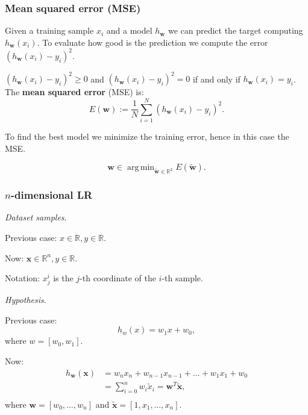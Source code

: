 \documentclass{beamer}
\DeclareMathOperator*{\argmin}{arg\,min}
\begin{document}
	\begin{frame}
		\frametitle{Mean squared error (MSE)}
		
		
		Given a training sample $x_i$ and a model $h_{\bm{w}}$ we can predict the target computing $h_{\bm{w}}(x_i)$. To evaluate how good is the prediction we compute the error $(h_{\bm{w}}(x_i) - y_i)^2$.
		
		\vspace{5 mm}
		
		$(h_{\bm{w}}(x_i) - y_i)^2 \geq 0$ and $(h_{\bm{w}}(x_i) - y_i)^2 = 0$ if and only if $h_{\bm{w}}(x_i) = y_i$. The \textbf{mean squared error} (MSE) is:
		$$E({\bm{w}}) := \frac{1}{N} \sum_{i=1}^{N} (h_{\bm{w}}(x_i) - y_i)^2.$$
		
		To find the best model we minimize the training error, hence in this case the MSE.
		
		$$\bm{w} \in \argmin_{\tilde{\bm{w}} \in \mathbb{R}^2} E(\tilde{\bm{w}}).$$
		
	\end{frame}

	\begin{frame}
		\frametitle{$n$-dimensional LR}
		\textsl{Dataset samples}.
		
		Previous case: $x \in \mathbb{R}, y \in \mathbb{R}$.
		
		\vspace{1 mm}
		
		Now:  $\bm{x} \in \mathbb{R}^n, y \in \mathbb{R}$.
		
		Notation: $x^i_j$ is the $j$-th coordinate of the $i$-th sample.
		
		\vspace{5 mm}
		
		\textsl{Hypothesis}.
		
		Previous case: 
		\begin{equation*}
			h_{w}(x) = w_1x + w_0,
		\end{equation*}
		where $w = [w_0, w_1]$.
		
		\vspace{1 mm}
		
		Now: 
		\begin{align*}
			h_{\bm{w}}(\bm{x}) &= w_{n}x_n + w_{n-1}x_{n-1} + \dots + w_1 x_1 + w_0\\
			&= \sum_{i=0}^n w_i \tilde{x}_i = \bm{w}^T \tilde{\bm{x}},\\
		\end{align*}
		where $\bm{w} = [w_0, \dots, w_n]$ and $\tilde{\bm{x}} = [1, x_1, \dots, x_n]$.
		
	\end{frame}
\end{document}
